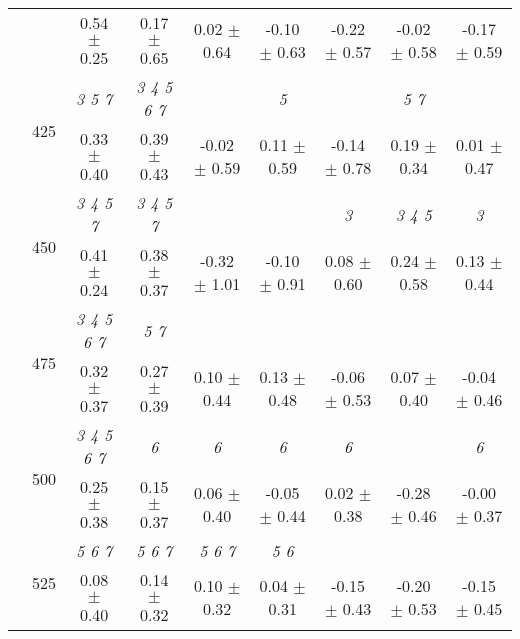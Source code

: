 \begin{table}[h]
{\begin{tabular}{
        ccccccccc}
 & & 0.54 $\pm$ 0.25& 0.17 $\pm$ 0.65& 0.02 $\pm$ 0.64& -0.10 $\pm$ 0.63& -0.22 $\pm$ 0.57& -0.02 $\pm$ 0.58& -0.17 $\pm$ 0.59 \\ 
 & \multirow{2}{*}{425}& \cellcolor[HTML]{EFEFEF} \textit{ 3 5 7 }& \cellcolor[HTML]{EFEFEF} \textit{ 3 4 5 6 7 }& \cellcolor[HTML]{EFEFEF} & \cellcolor[HTML]{EFEFEF} \textit{ 5 }& \cellcolor[HTML]{EFEFEF} & \cellcolor[HTML]{EFEFEF} \textit{ 5 7 }& \cellcolor[HTML]{EFEFEF}  \\ 
 & & \cellcolor[HTML]{EFEFEF} 0.33 $\pm$ 0.40& \cellcolor[HTML]{EFEFEF} 0.39 $\pm$ 0.43& \cellcolor[HTML]{EFEFEF} -0.02 $\pm$ 0.59& \cellcolor[HTML]{EFEFEF} 0.11 $\pm$ 0.59& \cellcolor[HTML]{EFEFEF} -0.14 $\pm$ 0.78& \cellcolor[HTML]{EFEFEF} 0.19 $\pm$ 0.34& \cellcolor[HTML]{EFEFEF} 0.01 $\pm$ 0.47 \\ 
 & \multirow{2}{*}{450}& \textit{ 3 4 5 7 }& \textit{ 3 4 5 7 }& & & \textit{ 3 }& \textit{ 3 4 5 }& \textit{ 3 } \\ 
 & & 0.41 $\pm$ 0.24& 0.38 $\pm$ 0.37& -0.32 $\pm$ 1.01& -0.10 $\pm$ 0.91& 0.08 $\pm$ 0.60& 0.24 $\pm$ 0.58& 0.13 $\pm$ 0.44 \\ 
 & \multirow{2}{*}{475}& \cellcolor[HTML]{EFEFEF} \textit{ 3 4 5 6 7 }& \cellcolor[HTML]{EFEFEF} \textit{ 5 7 }& \cellcolor[HTML]{EFEFEF} & \cellcolor[HTML]{EFEFEF} & \cellcolor[HTML]{EFEFEF} & \cellcolor[HTML]{EFEFEF} & \cellcolor[HTML]{EFEFEF}  \\ 
 & & \cellcolor[HTML]{EFEFEF} 0.32 $\pm$ 0.37& \cellcolor[HTML]{EFEFEF} 0.27 $\pm$ 0.39& \cellcolor[HTML]{EFEFEF} 0.10 $\pm$ 0.44& \cellcolor[HTML]{EFEFEF} 0.13 $\pm$ 0.48& \cellcolor[HTML]{EFEFEF} -0.06 $\pm$ 0.53& \cellcolor[HTML]{EFEFEF} 0.07 $\pm$ 0.40& \cellcolor[HTML]{EFEFEF} -0.04 $\pm$ 0.46 \\ 
 & \multirow{2}{*}{500}& \textit{ 3 4 5 6 7 }& \textit{ 6 }& \textit{ 6 }& \textit{ 6 }& \textit{ 6 }& & \textit{ 6 } \\ 
 & & 0.25 $\pm$ 0.38& 0.15 $\pm$ 0.37& 0.06 $\pm$ 0.40& -0.05 $\pm$ 0.44& 0.02 $\pm$ 0.38& -0.28 $\pm$ 0.46& -0.00 $\pm$ 0.37 \\ 
 & \multirow{2}{*}{525}& \cellcolor[HTML]{EFEFEF} \textit{ 5 6 7 }& \cellcolor[HTML]{EFEFEF} \textit{ 5 6 7 }& \cellcolor[HTML]{EFEFEF} \textit{ 5 6 7 }& \cellcolor[HTML]{EFEFEF} \textit{ 5 6 }& \cellcolor[HTML]{EFEFEF} & \cellcolor[HTML]{EFEFEF} & \cellcolor[HTML]{EFEFEF}  \\ 
 & & \cellcolor[HTML]{EFEFEF} 0.08 $\pm$ 0.40& \cellcolor[HTML]{EFEFEF} 0.14 $\pm$ 0.32& \cellcolor[HTML]{EFEFEF} 0.10 $\pm$ 0.32& \cellcolor[HTML]{EFEFEF} 0.04 $\pm$ 0.31& \cellcolor[HTML]{EFEFEF} -0.15 $\pm$ 0.43& \cellcolor[HTML]{EFEFEF} -0.20 $\pm$ 0.53& \cellcolor[HTML]{EFEFEF} -0.15 $\pm$ 0.45 \\ 

\end{tabular}}
\end{table}
